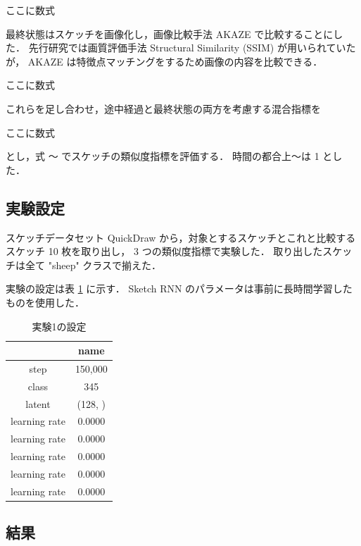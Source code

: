 \documentclass[twocolumn]{jarticle}     %
\begin{document}
ここに数式

最終状態はスケッチを画像化し，画像比較手法 AKAZE で比較することにした．
先行研究では画質評価手法 Structural Similarity (SSIM) が用いられていたが，
AKAZE は特徴点マッチングをするため画像の内容を比較できる．

ここに数式


これらを足し合わせ，途中経過と最終状態の両方を考慮する混合指標を

ここに数式

とし，式 ～ でスケッチの類似度指標を評価する．
時間の都合上～は 1 とした．

\subsection{実験設定}
スケッチデータセット QuickDraw から，対象とするスケッチとこれと比較するスケッチ 10 枚を取り出し，
3 つの類似度指標で実験した．
取り出したスケッチは全て "sheep" クラスで揃えた．

実験の設定は表 \ref{tab:setting1} に示す．
Sketch RNN のパラメータは事前に長時間学習したものを使用した．

\begin{table}[tb]
  \begin{center}
    \caption{実験1の設定}
    \begin{tabular}{|c|c|} \hline
       & name \\ \hline
      step & 150,000 \\ \hline
      class & 345 \\ \hline
      latent & (128, ) \\ \hline
      learning rate & 0.0000 \\ \hline
      learning rate & 0.0000 \\ \hline
      learning rate & 0.0000 \\ \hline
      learning rate & 0.0000 \\ \hline
      learning rate & 0.0000 \\ \hline
    \end{tabular}
    \label{tab:setting1}
  \end{center}
\end{table}

\subsection{結果}
\end{document}
